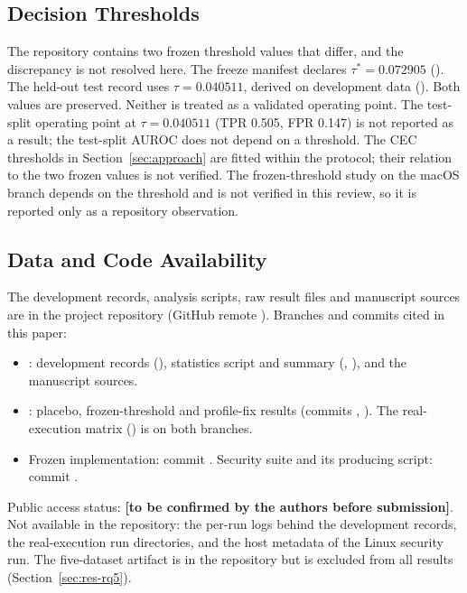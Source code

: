 \subsection{Decision Thresholds}
The repository contains two frozen threshold values that differ, and the discrepancy is not resolved here. The freeze manifest declares $\tau^\ast=0.072905$ (). The held-out test record uses $\tau=0.040511$, derived on development data (). Both values are preserved. Neither is treated as a validated operating point. The test-split operating point at $\tau=0.040511$ (TPR 0.505, FPR 0.147) is not reported as a result; the test-split AUROC does not depend on a threshold. The CEC thresholds in Section~\ref{sec:approach} are fitted within the protocol; their relation to the two frozen values is not verified. The frozen-threshold study on the macOS branch depends on the threshold and is not verified in this review, so it is reported only as a repository observation.

\subsection{Data and Code Availability}
The development records, analysis scripts, raw result files and manuscript sources are in the project repository (GitHub remote ). Branches and commits cited in this paper:
\begin{itemize}
\item {}: development records (), statistics script and summary (, ), and the manuscript sources.
\item {}: placebo, frozen-threshold and profile-fix results (commits , ). The real-execution matrix () is on both branches.
\item Frozen implementation: commit . Security suite and its producing script: commit .
\end{itemize}
Public access status: \textbf{[to be confirmed by the authors before submission]}. Not available in the repository: the per-run logs behind the development records, the real-execution run directories, and the host metadata of the Linux security run. The five-dataset artifact is in the repository but is excluded from all results (Section~\ref{sec:res-rq5}).

